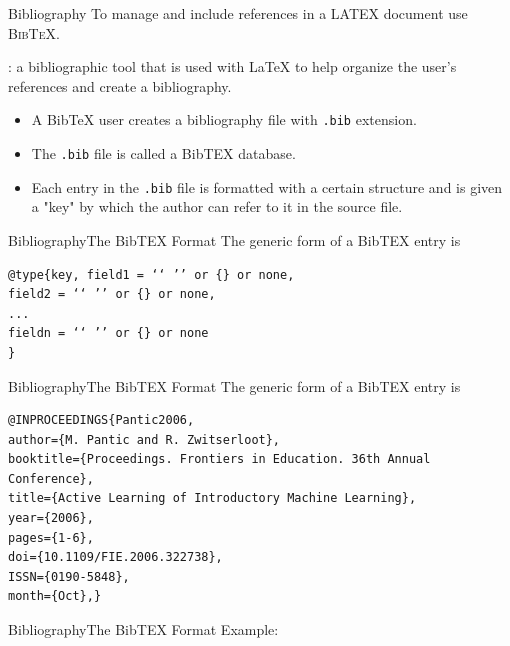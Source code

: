 \documentclass{bredelebeamer}
\begin{document}
\begin{frame}{Bibliography}
To manage and include references in a LATEX document use \textsc{BibTeX}.\\
\begin{description}
	\item[BibTex]: a bibliographic tool that is used with LaTeX to help organize the user's references and create a bibliography.
\end{description}
\begin{itemize}
	\item A BibTeX user creates a bibliography file with \texttt{.bib} extension.
	\item The \texttt{.bib} file is called a BibTEX database.
	\item Each entry in the \texttt{.bib} file is formatted with a certain structure and is given a \alert{"key"} by which the author can refer to it in the source file.
\end{itemize}
\end{frame}

\begin{frame}[fragile]{Bibliography}{The BibTEX Format}
The generic form of a BibTEX entry is
\begin{center}
\begin{verbatim}
@type{key, field1 = ‘‘ ’’ or {} or none,
field2 = ‘‘ ’’ or {} or none, 
... 
fieldn = ‘‘ ’’ or {} or none 
}
\end{verbatim}
\end{center}
\end{frame}
\begin{frame}[fragile]{Bibliography}{The BibTEX Format}
The generic form of a BibTEX entry is
\begin{center}
	\footnotesize
\begin{verbatim}
@INPROCEEDINGS{Pantic2006, 
author={M. Pantic and R. Zwitserloot}, 
booktitle={Proceedings. Frontiers in Education. 36th Annual Conference}, 
title={Active Learning of Introductory Machine Learning}, 
year={2006}, 
pages={1-6},  
doi={10.1109/FIE.2006.322738}, 
ISSN={0190-5848}, 
month={Oct},}
\end{verbatim}
\end{center}
\end{frame}

\begin{frame}[fragile]{Bibliography}{The BibTEX Format}
\alert{Example:}
\end{frame}
\end{document}

